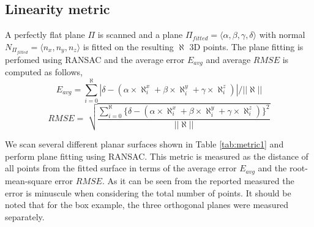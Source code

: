 \documentclass[final,12pt,3p]{elsarticle}
\begin{document}
\subsection{Linearity metric}
\label{subsec:linearity}
A perfectly flat plane $\Pi$ is scanned and a plane $\Pi_{fitted} = \langle \alpha, \beta, \gamma, \delta \rangle$ with normal $N_{\Pi_{fitted}} = \langle n_{x}, n_{y}, n_{z} \rangle$ is fitted on the resulting $\aleph$ 3D points. The plane fitting is perfomed using RANSAC and the average error $E_{avg}$ and average $RMSE$ is computed as follows,
\vspace{-10pt}
\begin{equation}
	E_{avg} = \sum_{i=0}^{\aleph} |\delta - (\alpha \times \aleph_{i}^{x} + \beta \times \aleph_{i}^{y} + \gamma \times \aleph_{i}^{z})|/ ||\aleph||
\end{equation}
\vspace{-10pt}
\begin{equation}
	RMSE = \sqrt[]{\frac{\sum_{i=0}^{\aleph} \lbrace \delta - (\alpha \times \aleph_{i}^{x} + \beta \times \aleph_{i}^{y} + \gamma \times \aleph_{i}^{z}) \rbrace^2}{||\aleph||}}
\end{equation}

We scan several different planar surfaces shown in Table \ref{tab:metric1} and perform plane fitting using RANSAC. This metric is measured as the distance of all points from the fitted surface in terms of the average error $E_{avg}$ and the root-mean-square error $RMSE$. As it can be seen from the reported measured the error is minuscule when considering the total number of points. It should be noted that for the box example, the three orthogonal planes were measured separately.
\end{document}
